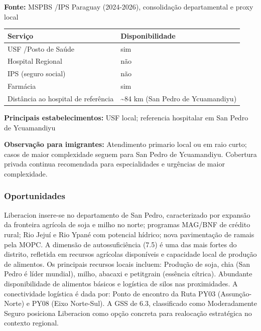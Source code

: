 \textbf{Fonte:} MSPBS /\allowbreak  IPS Paraguay (2024-2026), consolidação
departamental e proxy local

{\def\LTcaptype{none} %
\begin{longtable}[]{@{}
  >{\raggedright\arraybackslash}p{}
  >{\raggedright\arraybackslash}p{}@{}}
\toprule\noalign{}
\begin{minipage}[b]{\linewidth}\raggedright
Serviço
\end{minipage} & \begin{minipage}[b]{\linewidth}\raggedright
Disponibilidade
\end{minipage} \\
\midrule\noalign{}
\endhead
\bottomrule\noalign{}
\endlastfoot
USF /\allowbreak  Posto de Saúde & sim \\
Hospital Regional & não \\
IPS (seguro social) & não \\
Farmácia & sim \\
Distância ao hospital de referência & \textasciitilde84 km (San Pedro de
Ycuamandiyu) \\
\end{longtable}
}

\textbf{Principais estabelecimentos:} USF local; referencia hospitalar
em San Pedro de Ycuamandiyu

\textbf{Observação para imigrantes:} Atendimento primario local ou em
raio curto; casos de maior complexidade seguem para San Pedro de
Ycuamandiyu. Cobertura privada continua recomendada para especialidades
e urgências de maior complexidade.
\newpage

\subsubsection*{Oportunidades}\label{oport-liberacion-0220}
Liberacion insere-se no departamento de San Pedro, caracterizado por expansão da fronteira agrícola de soja e milho no norte; programas MAG/BNF de crédito rural; Rio Jejuí e Rio Ypané com potencial hídrico; nova pavimentação de ramais pela MOPC. A dimensão de autossuficiência (7.5) é uma das mais fortes do distrito, refletida em recursos agrícolas disponíveis e capacidade local de produção de alimentos. Os principais recursos locais incluem: Produção de soja, chia (San Pedro é líder mundial), milho, abacaxi e petitgrain (essência cítrica). Abundante disponibilidade de alimentos básicos e logística de silos nas proximidades. A conectividade logística é dada por: Ponto de encontro da Ruta PY03 (Assunção-Norte) e PY08 (Eixo Norte-Sul). A GSS de 6.3, classificado como Moderadamente Seguro posiciona Liberacion como opção concreta para realocação estratégica no contexto regional.


